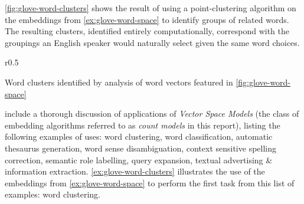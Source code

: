 \documentclass{ucetd}
\begin{document}
\begin{example}\label{ex:glove-word-clusters}
  \autoref{fig:glove-word-clusters} shows the result of using a point-clustering algorithm on the embeddings from \autoref{ex:glove-word-space} to identify groups of related words. The resulting clusters, identified entirely computationally, correspond with the groupings an English speaker would naturally select given the same word choices.
\end{example}
\par
\begin{figurewrap}[10]{r}{0.5\textwidth}
  \vspace{-3.5em}
  \captionsetup{width=.4\textwidth}
  \centering
  
  \caption{Word clusters identified by analysis of word vectors featured in \autoref{fig:glove-word-space}}\label{fig:glove-word-clusters}
\end{figurewrap}
\par
\textcite{turney10-from-frequen-to-meanin} include a thorough discussion of applications of \emph{Vector Space Models} (the class of embedding algorithms referred to as \emph{count models} in this report), listing the following examples of uses: word clustering, word classification, automatic thesaurus generation, word sense disambiguation, context sensitive spelling correction, semantic role labelling, query expansion, textual advertising \& information extraction. \autoref{ex:glove-word-clusters} illustrates the use of the embeddings from \autoref{ex:glove-word-space} to perform the first task from this list of examples: word clustering.
\end{document}

